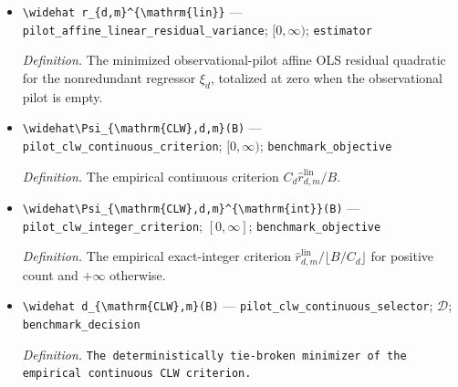 \documentclass{article}
\begin{document}
\begin{itemize}
  \par\smallskip\noindent\emph{Definition.} A deterministic early-proxy signal sequence satisfying \(\epsilon_m\downarrow0\) along the empirical CLW witness path.
  \item \texttt{\textbackslash{}\allowbreak{}widehat r\_\allowbreak{}\{d,\allowbreak{}m\}\allowbreak{}\textasciicircum{}\{\textbackslash{}\allowbreak{}mathrm\{lin\}\allowbreak{}\}\allowbreak{}} --- \texttt{pilot\_\allowbreak{}affine\_\allowbreak{}linear\_\allowbreak{}residual\_\allowbreak{}variance}; \([0,\infty)\); \texttt{estimator}
  \par\smallskip\noindent\emph{Definition.} The minimized observational-pilot affine OLS residual quadratic for the nonredundant regressor \(\xi_d\), totalized at zero when the observational pilot is empty.
  \item \texttt{\textbackslash{}\allowbreak{}widehat\textbackslash{}\allowbreak{}Psi\_\allowbreak{}\{\textbackslash{}\allowbreak{}mathrm\{CLW\}\allowbreak{},\allowbreak{}d,\allowbreak{}m\}\allowbreak{}(B)} --- \texttt{pilot\_\allowbreak{}clw\_\allowbreak{}continuous\_\allowbreak{}criterion}; \([0,\infty)\); \texttt{benchmark\_\allowbreak{}objective}
  \par\smallskip\noindent\emph{Definition.} The empirical continuous criterion \(C_d\widehat r_{d,m}^{\mathrm{lin}}/B\).
  \item \texttt{\textbackslash{}\allowbreak{}widehat\textbackslash{}\allowbreak{}Psi\_\allowbreak{}\{\textbackslash{}\allowbreak{}mathrm\{CLW\}\allowbreak{},\allowbreak{}d,\allowbreak{}m\}\allowbreak{}\textasciicircum{}\{\textbackslash{}\allowbreak{}mathrm\{int\}\allowbreak{}\}\allowbreak{}(B)} --- \texttt{pilot\_\allowbreak{}clw\_\allowbreak{}integer\_\allowbreak{}criterion}; \([0,\infty]\); \texttt{benchmark\_\allowbreak{}objective}
  \par\smallskip\noindent\emph{Definition.} The empirical exact-integer criterion \(\widehat r_{d,m}^{\mathrm{lin}}/\lfloor B/C_d\rfloor\) for positive count and \(+\infty\) otherwise.
  \item \texttt{\textbackslash{}\allowbreak{}widehat d\_\allowbreak{}\{\textbackslash{}\allowbreak{}mathrm\{CLW\}\allowbreak{},\allowbreak{}m\}\allowbreak{}(B)} --- \texttt{pilot\_\allowbreak{}clw\_\allowbreak{}continuous\_\allowbreak{}selector}; \(\mathcal D\); \texttt{benchmark\_\allowbreak{}decision}
  \par\smallskip\noindent\emph{Definition.} \texttt{The deterministically tie-\allowbreak{}broken minimizer of the empirical continuous CLW criterion.}

\end{itemize}
\end{document}
